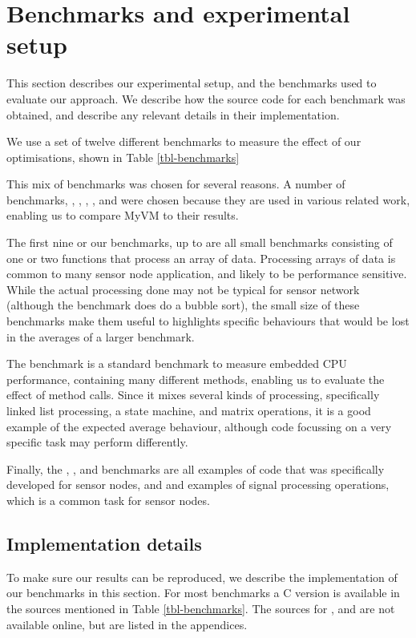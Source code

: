 \section{Benchmarks and experimental setup}
\label{sec-evaluation-benchmarks}
This section describes our experimental setup, and the benchmarks used to evaluate our approach. We describe how the source code for each benchmark was obtained, and describe any relevant details in their implementation.

We use a set of twelve different benchmarks to measure the effect of our optimisations, shown in Table \ref{tbl-benchmarks}



This mix of benchmarks was chosen for several reasons. A number of benchmarks, , , , , and  were chosen because they are used in various related work, enabling us to compare MyVM to their results.

The first nine or our benchmarks, up to  are all small benchmarks consisting of one or two functions that process an array of data. Processing arrays of data is common to many sensor node application, and likely to be performance sensitive. While the actual processing done may not be typical for sensor network (although the  benchmark does do a bubble sort), the small size of these benchmarks make them useful to highlights specific behaviours that would be lost in the averages of a larger benchmark.

The  benchmark is a standard benchmark to measure embedded CPU performance, containing many different methods, enabling us to evaluate the effect of method calls. Since it mixes several kinds of processing, specifically linked list processing, a state machine, and matrix operations, it is a good example of the expected average behaviour, although code focussing on a very specific task may perform differently.

Finally, the , , and  benchmarks are all examples of code that was specifically developed for sensor nodes, and  and  examples of signal processing operations, which is a common task for sensor nodes.


\subsection{Implementation details}
To make sure our results can be reproduced, we describe the implementation of our benchmarks in this section. For most benchmarks a C version is available in the sources mentioned in Table \ref{tbl-benchmarks}. The sources for ,  and  are not available online, but are listed in the appendices.

